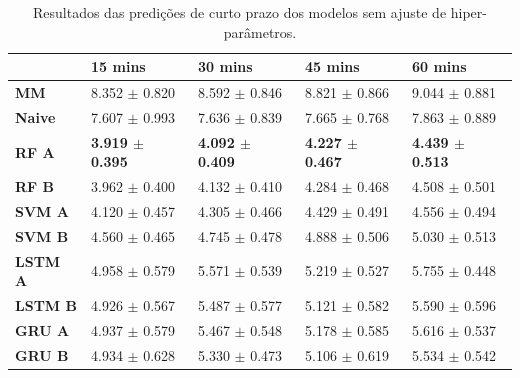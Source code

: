 \begin{table}[H]
    \begin{tabular*}{\linewidth}{@{\extracolsep{\fill}}lllll}
    \toprule
     & 
    \multicolumn{1}{l}{\textbf{15 mins}} & 
    \multicolumn{1}{l}{\textbf{30 mins}} &
    \multicolumn{1}{l}{\textbf{45 mins}} &
    \multicolumn{1}{l}{\textbf{60 mins}} \\
\midrule
\textbf{MM} & 8.352 $\pm$ 0.820 & 8.592 $\pm$ 0.846 & 8.821 $\pm$ 0.866 & 9.044 $\pm$ 0.881
\\

\midrule
\textbf{Naive} & 7.607 $\pm$ 0.993 & 7.636 $\pm$ 0.839 & 7.665 $\pm$ 0.768 & 7.863 $\pm$ 0.889
\\

\midrule
\textbf{RF A} & \textbf{3.919 $\pm$ 0.395} & \textbf{4.092 $\pm$ 0.409} & \textbf{4.227 $\pm$ 0.467} & \textbf{4.439 $\pm$ 0.513}
\\

\midrule
\textbf{RF B} & 3.962 $\pm$ 0.400 & 4.132 $\pm$ 0.410 & 4.284 $\pm$ 0.468 & 4.508 $\pm$ 0.501
\\

\midrule
\textbf{SVM A} & 4.120 $\pm$ 0.457 & 4.305 $\pm$ 0.466 & 4.429 $\pm$ 0.491 & 4.556 $\pm$ 0.494
\\

\midrule
\textbf{SVM B} & 4.560 $\pm$ 0.465 & 4.745 $\pm$ 0.478 & 4.888 $\pm$ 0.506 & 5.030 $\pm$ 0.513
\\

\midrule
\textbf{LSTM A} & 4.958 $\pm$ 0.579 & 5.571 $\pm$ 0.539 & 5.219 $\pm$ 0.527 & 5.755 $\pm$ 0.448
\\

\midrule
\textbf{LSTM B} & 4.926 $\pm$ 0.567 & 5.487 $\pm$ 0.577 & 5.121 $\pm$ 0.582 & 5.590 $\pm$ 0.596
\\

\midrule
\textbf{GRU A} & 4.937 $\pm$ 0.579 & 5.467 $\pm$ 0.548 & 5.178 $\pm$ 0.585 & 5.616 $\pm$ 0.537
\\

\midrule
\textbf{GRU B} & 4.934 $\pm$ 0.628 & 5.330 $\pm$ 0.473 & 5.106 $\pm$ 0.619 & 5.534 $\pm$ 0.542
\\
    \bottomrule
    \end{tabular*}
    \label{table:curto_prazo_no_tuning}
    \caption{Resultados das predições de curto prazo dos modelos sem ajuste de hiper-parâmetros.}
\end{table}

